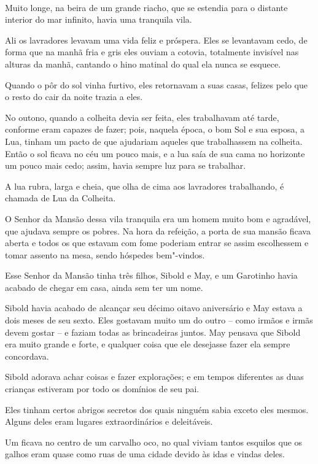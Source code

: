  
\ \


Muito longe, na beira de um grande riacho, que se estendia para o
distante interior do mar infinito, havia uma tranquila vila.

Ali os lavradores levavam uma vida feliz e próspera. Eles se levantavam
cedo, de forma que na manhã fria e gris eles ouviam a cotovia,
totalmente invisível nas alturas da manhã, cantando o hino matinal do
qual ela nunca se esquece.

Quando o pôr do sol vinha furtivo, eles retornavam a suas casas, felizes
pelo que o resto do cair da noite trazia a eles.

No outono, quando a colheita devia ser feita, eles trabalhavam até
tarde, conforme eram capazes de fazer; pois, naquela época, o bom Sol e
sua esposa, a Lua, tinham um pacto de que ajudariam aqueles que
trabalhassem na colheita. Então o sol ficava no céu um pouco mais, e a
lua saía de sua cama no horizonte um pouco mais cedo; assim, havia
sempre luz para se trabalhar.

A lua rubra, larga e cheia, que olha de cima aos lavradores trabalhando,
é chamada de Lua da Colheita.

O Senhor da Mansão dessa vila tranquila era um homem muito bom e
agradável, que ajudava sempre os pobres. Na hora da refeição, a porta de
sua mansão ficava aberta e todos os que estavam com fome poderiam entrar
se assim escolhessem e tomar assento na mesa, sendo hóspedes bem"-vindos.

Esse Senhor da Mansão tinha três filhos, Sibold e May, e um Garotinho
havia acabado de chegar em casa, ainda sem ter um nome.

Sibold havia acabado de alcançar seu décimo oitavo aniversário e May
estava a dois meses de seu sexto. Eles gostavam muito um do outro --
como irmãos e irmãs devem gostar -- e faziam todas as brincadeiras
juntos. May pensava que Sibold era muito grande e forte, e qualquer
coisa que ele desejasse fazer ela sempre concordava.

Sibold adorava achar coisas e fazer explorações; e em tempos diferentes
as duas crianças estiveram por todo os domínios de seu pai.

Eles tinham certos abrigos secretos dos quais ninguém sabia exceto eles
mesmos. Alguns deles eram lugares extraordinários e deleitáveis.

Um ficava no centro de um carvalho oco, no qual viviam tantos esquilos
que os galhos eram quase como ruas de uma cidade devido às idas e vindas
deles.

